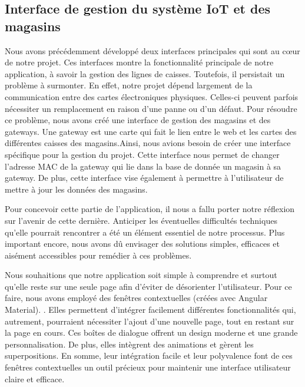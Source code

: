\documentclass[12pt]{article}
\begin{document}
 \subsection{Interface de gestion du système IoT et des magasins }

\justify
\text Nous avons précédemment développé deux interfaces principales qui sont au cœur de notre projet. Ces interfaces montre la fonctionnalité principale de notre application, à savoir la gestion des lignes de caisses. Toutefois, il persistait un problème à surmonter. En effet, notre projet dépend largement de la communication entre des cartes électroniques physiques. Celles-ci peuvent parfois nécessiter un remplacement en raison d'une panne ou d'un défaut. Pour résoudre ce problème, nous avons créé une interface de gestion des magasins et des gateways. Une gateway est une carte qui fait le lien entre le web et les cartes des différentes caisses des magasins.Ainsi, nous avions besoin de créer une interface spécifique pour la gestion du projet. Cette interface nous permet de changer l'adresse MAC de la gateway qui lie dans la base de donnée un magasin à sa gateway. De plus, cette interface vise également à permettre à l'utilisateur de mettre à jour les données des magasins.

\justify
\text Pour concevoir cette partie de l'application, il nous a fallu porter notre réflexion sur l'avenir de cette dernière. Anticiper les éventuelles difficultés techniques qu'elle pourrait rencontrer a été un élément essentiel de notre processus. Plus important encore, nous avons dû envisager des solutions simples, efficaces et aisément accessibles pour remédier à ces problèmes.

\justify
\text Nous souhaitions que notre application soit simple à comprendre et surtout qu'elle reste sur une seule page afin d'éviter de désorienter l'utilisateur. Pour ce faire, nous avons employé des fenêtres contextuelles (créées avec Angular Material). . Elles permettent d'intégrer facilement différentes fonctionnalités qui, autrement, pourraient nécessiter l'ajout d'une nouvelle page, tout en restant sur la page en cours. Ces boîtes de dialogue offrent un design moderne et une grande personnalisation. De plus, elles  intègrent des animations et gèrent les superpositions. En somme, leur intégration facile et leur polyvalence font de ces fenêtres contextuelles un outil précieux pour maintenir une interface utilisateur claire et efficace.
\end{document}
